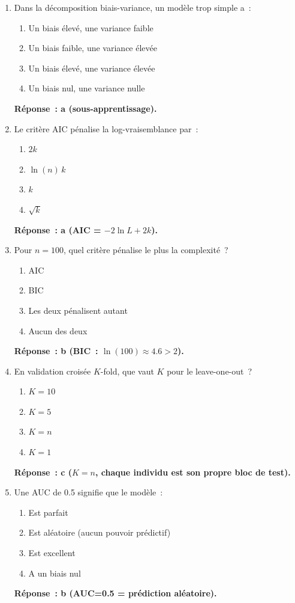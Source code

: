 \documentclass[a4paper,11pt]{article}
\theoremstyle{definition}
\theoremstyle{remark}
\begin{document}
\begin{enumerate}
  \item Dans la d\'ecomposition biais-variance, un mod\`ele trop
    simple a~:
    \begin{enumerate}
      \item Un biais \'elev\'e, une variance faible
      \item Un biais faible, une variance \'elev\'ee
      \item Un biais \'elev\'e, une variance \'elev\'ee
      \item Un biais nul, une variance nulle
    \end{enumerate}
    \textbf{R\'eponse~: a (sous-apprentissage).}

  \item Le crit\`ere AIC p\'enalise la log-vraisemblance par~:
    \begin{enumerate}
      \item $2k$
      \item $\ln(n)\,k$
      \item $k$
      \item $\sqrt{k}$
    \end{enumerate}
    \textbf{R\'eponse~: a (AIC = $-2\ln L + 2k$).}

  \item Pour $n=100$, quel crit\`ere p\'enalise le plus la
    complexit\'e~?
    \begin{enumerate}
      \item AIC
      \item BIC
      \item Les deux p\'enalisent autant
      \item Aucun des deux
    \end{enumerate}
    \textbf{R\'eponse~: b (BIC~: $\ln(100) \approx 4.6 > 2$).}

  \item En validation crois\'ee $K$-fold, que vaut $K$ pour le
    leave-one-out~?
    \begin{enumerate}
      \item $K=10$
      \item $K=5$
      \item $K=n$
      \item $K=1$
    \end{enumerate}
    \textbf{R\'eponse~: c ($K=n$, chaque individu est son propre
    bloc de test).}

  \item Une AUC de 0.5 signifie que le mod\`ele~:
    \begin{enumerate}
      \item Est parfait
      \item Est al\'eatoire (aucun pouvoir pr\'edictif)
      \item Est excellent
      \item A un biais nul
    \end{enumerate}
    \textbf{R\'eponse~: b (AUC=0.5 = pr\'ediction al\'eatoire).}


\end{enumerate}
\end{document}
